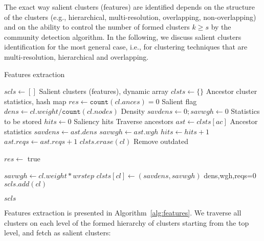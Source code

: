 \documentclass[conference]{IEEEtran}
\begin{document}
The exact way salient clusters (features) are identified depends on the structure of the clusters (e.g., hierarchical, multi-resolution, overlapping, non-overlapping) and on the ability to control the number of formed clusters $k \ge s$ by the community detection algorithm.
In the following, we discuss salient clusters identification for the most general case, i.e., for clustering techniques that are multi-resolution, hierarchical and overlapping. \begin{algorithm}[htbp]\small \caption{Features extraction}
\label{alg:features}
\begin{algorithmic}[1]  
	\State $scls \gets []$  \Comment Salient clusters (features), dynamic array
	\State $clsts \gets \{\}$  \Comment Ancestor cluster statistics, hash map
\State $res \gets \texttt{count}(cl.ances) = 0$  \label{aln:saltop}  \Comment Salient flag
			\State $dens \gets cl.weight / \texttt{count}(cl.nodes)$  \Comment Density
			\State $savdens \gets 0; savwgh \gets 0$  \Comment Statistics to be stored
				\State $hits \gets 0$  \Comment Saliency hits
				  \Comment Traverse ancestors
					\State $ast \gets clsts[ac]$  \Comment Ancestor statistics
						\State $savdens \gets ast.dens$
						\State $savwgh \gets ast.wgh$
					\EndIf
					 \label{aln:saldes}
						\State $hits \gets hits + 1$
\EndIf
					\State $ast.reqs \gets ast.reqs + 1$
					  \State $clsts.erase(cl)$  \Comment Remove outdated
					\EndIf
				\EndFor
			\EndIf

				\State $res \gets$ true
			\EndIf

			\State $savwgh \gets cl.weight * wrstep$ \label{aln:wrmul}
			\State $clsts[cl] \gets (savdens, savwgh)$  \Comment dens,wgh,reqs=0
				\State $scls.add(cl)$
			\EndIf
		\EndFor
	\EndFor

	\State \Return $scls$  
\EndFunction
\end{algorithmic}
\end{algorithm}
Features extraction is presented in Algorithm~\ref{alg:features}.
We traverse all clusters on each level of the formed hierarchy of clusters starting from the top level, and fetch as salient clusters:
\end{document}
